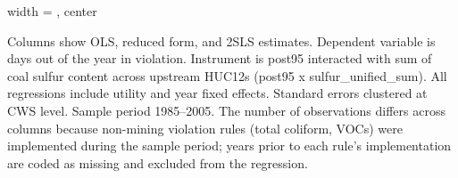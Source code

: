 \begin{table}[htbp]
\begin{adjustbox}{width = \textwidth, center}
      
      
   \end{adjustbox}
      {\tiny\linespread{1}\selectfont \par \raggedright 
   Columns show OLS, reduced form, and 2SLS estimates. Dependent variable is days out of the year in violation. Instrument is post95 interacted with sum of coal sulfur content across upstream HUC12s (post95 x sulfur\_unified\_sum). All regressions include utility and year fixed effects. Standard errors clustered at CWS level. Sample period 1985--2005. The number of observations differs across columns because non-mining violation rules (total coliform, VOCs) were implemented during the sample period; years prior to each rule's implementation are coded as missing and excluded from the regression.}
   
\end{table}


